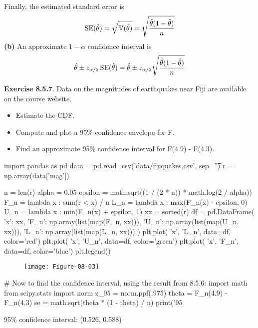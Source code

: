 Finally, the estimated standard error is
\[
\operatorname{\mathrm{SE}} (\hat{\theta}) = \sqrt{\operatorname{\mathbb{V}}(\hat{\theta})} = \sqrt{\frac{\hat{\theta}(1 - \hat{\theta})}{n}}
\]
\textbf{(b)}
An approximate \(1 - \alpha\) confidence interval is
\[
\hat{\theta} \pm z_{\alpha/2}\operatorname{\mathrm{SE}} (\hat{\theta}) = \hat{\theta} \pm z_{\alpha/2} \sqrt{\frac{\hat{\theta}(1 - \hat{\theta})}{n}}
\]

\textbf{Exercise 8.5.7}. Data on the magnitudes of earthquakes near Fiji
are available on the course website.
\begin{itemize}[tightlist]
\item
  Estimate the CDF.
\item
  Compute and plot a 95\% confidence envelope for F.
\item
  Find an approximate 95\% confidence interval for F(4.9) - F(4.3).
\end{itemize}

\begin{python}
import pandas as pd
data = pd.read_csv('data/fijiquakes.csv', sep='\t')
r = np.array(data['mag'])
\end{python}

\begin{python}
n = len(r)
alpha = 0.05
epsilon = math.sqrt((1 / (2 * n)) * math.log(2 / alpha))
F_n = lambda x : sum(r < x) / n
L_n = lambda x : max(F_n(x) - epsilon, 0)
U_n = lambda x : min(F_n(x) + epsilon, 1)
xx = sorted(r)
df = pd.DataFrame({
    'x': xx, 
    'F_n': np.array(list(map(F_n, xx))), 
    'U_n': np.array(list(map(U_n, xx))), 
    'L_n': np.array(list(map(L_n, xx)))
})
plt.plot( 'x', 'L_n', data=df, color='red')
plt.plot( 'x', 'U_n', data=df, color='green')
plt.plot( 'x', 'F_n', data=df, color='blue')
plt.legend()
\end{python}

\begin{figure}[H]
\centering
\texttt{[image: Figure-08-03]}
\end{figure}


\begin{python}
# Now to find the confidence interval, using the result from 8.5.6:
import math
from scipy.stats import norm
z_95 = norm.ppf(.975)
theta = F_n(4.9) - F_n(4.3)
se = math.sqrt(theta * (1 - theta) / n)
print('95%
\end{python}
\begin{console}
95\% confidence interval: (0.526, 0.588)
\end{console}

